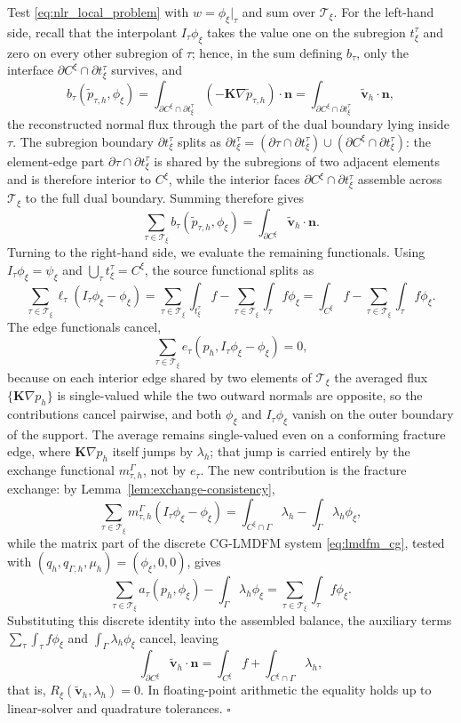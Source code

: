 \documentclass[a4paper,fleqn]{cas-sc}
\newcommand{\Kmat}{\mathbf{K}}
\newcommand{\vflux}{\mathbf{v}}
\begin{document}
Test \eqref{eq:nlr_local_problem} with \(w=\phi_\xi|_\tau\) and sum over
\(\mathcal{T}_\xi\). For the left-hand side, recall that the interpolant
\(I_\tau\phi_\xi\) takes the value one on the subregion \(t_\xi^\tau\) and zero
on every other subregion of \(\tau\); hence, in the sum defining \(b_\tau\),
only the interface \(\partial C^\xi\cap\partial t_\xi^\tau\) survives, and
\[
b_\tau(\widetilde p_{\tau,h},\phi_\xi)
=
\int_{\partial C^\xi\cap\partial t_\xi^\tau}
(-\Kmat\nabla\widetilde p_{\tau,h})\cdot\mathbf{n}
=
\int_{\partial C^\xi\cap\partial t_\xi^\tau}
\widetilde{\vflux}_h\cdot\mathbf{n},
\]
the reconstructed normal flux through the part of the dual boundary lying inside
\(\tau\). The subregion boundary \(\partial t_\xi^\tau\) splits as
\(\partial t_\xi^\tau=(\partial\tau\cap\partial t_\xi^\tau)\cup
(\partial C^\xi\cap\partial t_\xi^\tau)\): the element-edge part
\(\partial\tau\cap\partial t_\xi^\tau\) is shared by the subregions of two
adjacent elements and is therefore interior to \(C^\xi\), while the interior
faces \(\partial C^\xi\cap\partial t_\xi^\tau\) assemble across
\(\mathcal{T}_\xi\) to the full dual boundary. Summing therefore gives
\[
\sum_{\tau\in\mathcal{T}_\xi}
b_\tau(\widetilde p_{\tau,h},\phi_\xi)
=
\int_{\partial C^\xi}\widetilde{\vflux}_h\cdot\mathbf{n}.
\]
Turning to the right-hand side, we evaluate the remaining functionals. Using
\(I_\tau\phi_\xi=\psi_\xi\) and \(\bigcup_{\tau}t_\xi^\tau=C^\xi\), the source
functional splits as
\[
\sum_{\tau\in\mathcal{T}_\xi}\ell_\tau(I_\tau\phi_\xi-\phi_\xi)
=
\sum_{\tau\in\mathcal{T}_\xi}\int_{t_\xi^\tau} f
-
\sum_{\tau\in\mathcal{T}_\xi}\int_\tau f\phi_\xi
=
\int_{C^\xi} f-\sum_{\tau\in\mathcal{T}_\xi}\int_\tau f\phi_\xi .
\]
The edge functionals cancel,
\[
\sum_{\tau\in\mathcal{T}_\xi}e_\tau(p_h,I_\tau\phi_\xi-\phi_\xi)=0 ,
\]
because on each interior edge shared by two elements of \(\mathcal{T}_\xi\) the
averaged flux \(\{\Kmat\nabla p_h\}\) is single-valued while the two outward
normals are opposite, so the contributions cancel pairwise, and both
\(\phi_\xi\) and \(I_\tau\phi_\xi\) vanish on the outer boundary of the support.
The average remains single-valued even on a conforming fracture edge, where
\(\Kmat\nabla p_h\) itself jumps by \(\lambda_h\); that jump is carried entirely
by the exchange functional \(m_{\tau,h}^\Gamma\), not by \(e_\tau\). The new
contribution is the fracture exchange: by Lemma~\ref{lem:exchange-consistency},
\[
\sum_{\tau\in\mathcal{T}_\xi}
m_{\tau,h}^\Gamma(I_\tau\phi_\xi-\phi_\xi)
=
\int_{C^\xi\cap\Gamma}\lambda_h
-
\int_\Gamma\lambda_h\phi_\xi ,
\]
while the matrix part of the discrete CG-LMDFM system \eqref{eq:lmdfm_cg},
tested with \((q_h,q_{\Gamma,h},\mu_h)=(\phi_\xi,0,0)\), gives
\[
\sum_{\tau\in\mathcal{T}_\xi}
a_\tau(p_h,\phi_\xi)
-
\int_\Gamma\lambda_h\phi_\xi
=
\sum_{\tau\in\mathcal{T}_\xi}\int_\tau f\phi_\xi .
\]
Substituting this discrete identity into the assembled balance, the auxiliary
terms \(\sum_{\tau}\int_\tau f\phi_\xi\) and
\(\int_\Gamma\lambda_h\phi_\xi\) cancel, leaving
\[
  \int_{\partial C^\xi}\widetilde{\vflux}_h\cdot\mathbf{n}
  =
  \int_{C^\xi}f
  +
  \int_{C^\xi\cap\Gamma}\lambda_h ,
\]
that is, \(R_\xi(\widetilde{\vflux}_h,\lambda_h)=0\). In floating-point
arithmetic the equality holds up to linear-solver and quadrature tolerances.
\(\square\)
\end{document}
